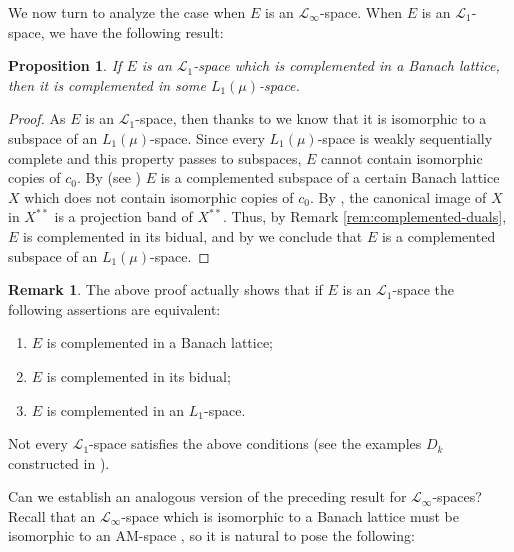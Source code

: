 \documentclass[11pt]{amsart}
\newtheorem{prop}[thm]{Proposition}
\theoremstyle{definition}
\newtheorem{rem}[thm]{Remark}
\numberwithin{equation}{section}
\begin{document}

We now turn to analyze the case when $E$ is an $\mathcal{L}_\infty$-space. When $E$ is an $\mathcal{L}_1$-space, we have the following result:

\begin{prop}
    If $E$ is an $\mathcal{L}_1$-space which is complemented in a Banach lattice, then it is complemented in some $L_1(\mu)$-space.
\end{prop}
\begin{proof}
As $E$ is an $\mathcal{L}_1$-space, then thanks to \cite[Proposition 7.1]{LP68} we know that it is isomorphic to a subspace of an $L_1(\mu)$-space. Since every $L_1(\mu)$-space is weakly sequentially complete and this property passes to subspaces, $E$ cannot contain isomorphic copies of $c_0$. By \cite[Proposition 1.c.6]{LT2-book} (see \cite[Proposition 2.6]{FJT75}) $E$ is a complemented subspace of a certain Banach lattice $X$ which does not contain isomorphic copies of $c_0$. By \cite[Theorem 1.c.4]{LT2-book}, the canonical image of $X$ in $X^{**}$ is a projection band of $X^{**}$. Thus, by Remark \ref{rem:complemented-duals}, $E$ is complemented in its bidual, and by \cite[Corollary 1 of Theorem 7.1]{LP68} we conclude that $E$ is a complemented subspace of an $L_1(\mu)$-space.
\end{proof}

\begin{rem}
The above proof actually shows that if $E$ is an $\mathcal{L}_1$-space the following assertions are equivalent:
\begin{enumerate}
    \item[(i)] $E$ is complemented in a Banach lattice;
    \item[(ii)] $E$ is complemented in its bidual;
    \item[(iii)] $E$ is complemented in an $L_1$-space.
\end{enumerate}
Not every $\mathcal{L}_1$-space satisfies the above conditions (see the examples $D_k$ constructed in \cite[p. 211]{LT-notes}).
\end{rem}

Can we establish an analogous version of the preceding result for $\mathcal{L}_\infty$-spaces? Recall that an $\mathcal{L}_\infty$-space which is isomorphic to a Banach lattice must be isomorphic to an AM-space \cite[Corollary 2.2]{dHMST23}, so it is natural to pose the following:
\end{document}
